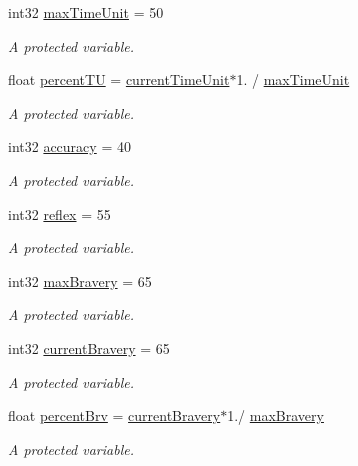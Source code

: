 \begin{DoxyCompactItemize}
int32 \hyperlink{class_a_unit2_d_a0a8041a5fc46bd09fed79303fbcd3ce5}{max\+Time\+Unit} = 50
\begin{DoxyCompactList}\small\item\em A protected variable. \end{DoxyCompactList}\item 
float \hyperlink{class_a_unit2_d_a45d8a7f3f28c1a641dd4124c4b7ba272}{percent\+TU} = \hyperlink{class_a_unit2_d_a24f6252522a9d97f9ea8ea9cbf6cca69}{current\+Time\+Unit}$\ast$1. / \hyperlink{class_a_unit2_d_a0a8041a5fc46bd09fed79303fbcd3ce5}{max\+Time\+Unit}
\begin{DoxyCompactList}\small\item\em A protected variable. \end{DoxyCompactList}\item 
int32 \hyperlink{class_a_unit2_d_a639a503e506215b11c81167154bf9bfd}{accuracy} = 40
\begin{DoxyCompactList}\small\item\em A protected variable. \end{DoxyCompactList}\item 
int32 \hyperlink{class_a_unit2_d_a178510f321f19d1fa8b19b1a16b7dcfb}{reflex} = 55
\begin{DoxyCompactList}\small\item\em A protected variable. \end{DoxyCompactList}\item 
int32 \hyperlink{class_a_unit2_d_a5e26bf8a80a9363d3538b1e1f675fb61}{max\+Bravery} = 65
\begin{DoxyCompactList}\small\item\em A protected variable. \end{DoxyCompactList}\item 
int32 \hyperlink{class_a_unit2_d_aee9f4f0703e027df353d51811befb1c3}{current\+Bravery} = 65
\begin{DoxyCompactList}\small\item\em A protected variable. \end{DoxyCompactList}\item 
float \hyperlink{class_a_unit2_d_a837bd3a0faaf2ebd2796de9a16da8fa0}{percent\+Brv} = \hyperlink{class_a_unit2_d_aee9f4f0703e027df353d51811befb1c3}{current\+Bravery}$\ast$1./ \hyperlink{class_a_unit2_d_a5e26bf8a80a9363d3538b1e1f675fb61}{max\+Bravery}
\begin{DoxyCompactList}\small\item\em A protected variable. \end{DoxyCompactList}\item 

\end{DoxyCompactItemize}

